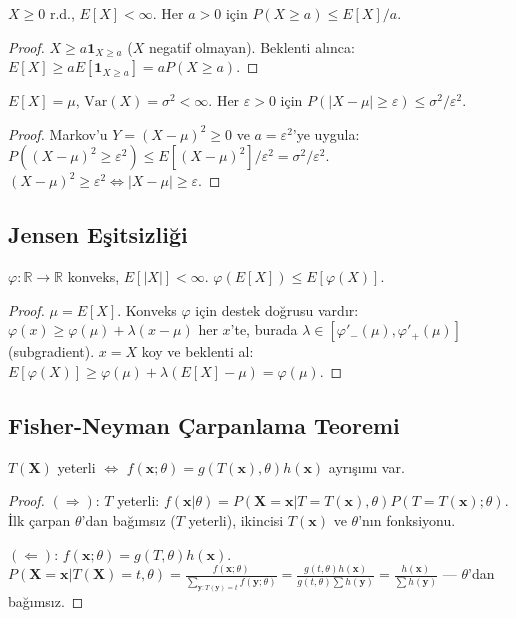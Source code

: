 \begin{teorem}
$X\geq0$ r.d., $E[X]<\infty$. Her $a>0$ için $P(X\geq a)\leq E[X]/a$.
\end{teorem}
\begin{proof}
$X\geq a\mathbf{1}_{X\geq a}$ ($X$ negatif olmayan). Beklenti alınca: $E[X]\geq aE[\mathbf{1}_{X\geq a}]=aP(X\geq a)$.
\end{proof}

\begin{teorem}
$E[X]=\mu$, $\mathrm{Var}(X)=\sigma^2<\infty$. Her $\varepsilon>0$ için $P(|X-\mu|\geq\varepsilon)\leq\sigma^2/\varepsilon^2$.
\end{teorem}
\begin{proof}
Markov'u $Y=(X-\mu)^2\geq0$ ve $a=\varepsilon^2$'ye uygula: $P((X-\mu)^2\geq\varepsilon^2)\leq E[(X-\mu)^2]/\varepsilon^2=\sigma^2/\varepsilon^2$. $(X-\mu)^2\geq\varepsilon^2\iff|X-\mu|\geq\varepsilon$.
\end{proof}

\subsection{Jensen Eşitsizliği}

\begin{teorem}
$\varphi:\mathbb{R}\to\mathbb{R}$ konveks, $E[|X|]<\infty$. $\varphi(E[X])\leq E[\varphi(X)]$.
\end{teorem}
\begin{proof}
$\mu=E[X]$. Konveks $\varphi$ için destek doğrusu vardır: $\varphi(x)\geq\varphi(\mu)+\lambda(x-\mu)$ her $x$'te, burada $\lambda\in[\varphi'_-(\mu),\varphi'_+(\mu)]$ (subgradient). $x=X$ koy ve beklenti al: $E[\varphi(X)]\geq\varphi(\mu)+\lambda(E[X]-\mu)=\varphi(\mu)$.
\end{proof}

\subsection{Fisher-Neyman Çarpanlama Teoremi}

\begin{teorem}
$T(\mathbf{X})$ yeterli $\iff$ $f(\mathbf{x};\theta)=g(T(\mathbf{x}),\theta)h(\mathbf{x})$ ayrışımı var.
\end{teorem}
\begin{proof}
$(\Rightarrow)$: $T$ yeterli: $f(\mathbf{x}|\theta)=P(\mathbf{X}=\mathbf{x}|T=T(\mathbf{x}),\theta)P(T=T(\mathbf{x});\theta)$. İlk çarpan $\theta$'dan bağımsız ($T$ yeterli), ikincisi $T(\mathbf{x})$ ve $\theta$'nın fonksiyonu.

$(\Leftarrow)$: $f(\mathbf{x};\theta)=g(T,\theta)h(\mathbf{x})$. $P(\mathbf{X}=\mathbf{x}|T(\mathbf{X})=t,\theta)=\frac{f(\mathbf{x};\theta)}{\sum_{\mathbf{y}:T(\mathbf{y})=t}f(\mathbf{y};\theta)}=\frac{g(t,\theta)h(\mathbf{x})}{g(t,\theta)\sum h(\mathbf{y})}=\frac{h(\mathbf{x})}{\sum h(\mathbf{y})}$ --- $\theta$'dan bağımsız.
\end{proof}

